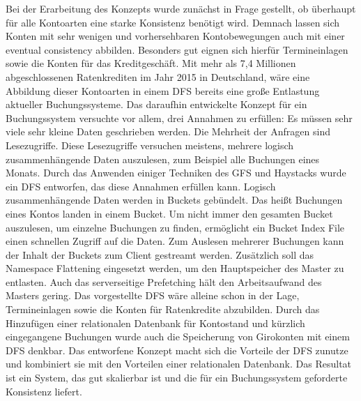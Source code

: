 \documentclass[12pt,oneside,a4paper,parskip]{scrbook}
\begin{document}
Bei der Erarbeitung des Konzepts wurde zunächst in Frage gestellt, ob überhaupt für alle Kontoarten eine starke Konsistenz benötigt wird. Demnach lassen sich Konten mit sehr wenigen und vorhersehbaren Kontobewegungen auch mit einer eventual consistency abbilden. Besonders gut eignen sich hierfür Termineinlagen sowie die Konten für das Kreditgeschäft. Mit mehr als 7,4 Millionen abgeschlossenen Ratenkrediten im Jahr 2015 in Deutschland, wäre eine Abbildung dieser Kontoarten in einem DFS bereits eine große Entlastung aktueller Buchungssysteme. Das daraufhin entwickelte Konzept für ein Buchungssystem versuchte vor allem, drei Annahmen zu erfüllen: Es müssen sehr viele sehr kleine Daten geschrieben werden. Die Mehrheit der Anfragen sind Lesezugriffe. Diese Lesezugriffe versuchen meistens, mehrere logisch zusammenhängende Daten auszulesen, zum Beispiel alle Buchungen eines Monats. Durch das Anwenden einiger Techniken des GFS und Haystacks wurde ein DFS entworfen, das diese Annahmen erfüllen kann. Logisch zusammenhängende Daten werden in Buckets gebündelt. Das heißt Buchungen eines Kontos landen in einem Bucket. Um nicht immer den gesamten Bucket auszulesen, um einzelne Buchungen zu finden, ermöglicht ein Bucket Index File einen schnellen Zugriff auf die Daten. Zum Auslesen mehrerer Buchungen kann der Inhalt der Buckets zum Client gestreamt werden. Zusätzlich soll das Namespace Flattening eingesetzt werden, um den Hauptspeicher des Master zu entlasten. Auch das serverseitige Prefetching hält den Arbeitsaufwand des Masters gering. Das vorgestellte DFS wäre alleine schon in der Lage, Termineinlagen sowie die Konten für Ratenkredite abzubilden. Durch das Hinzufügen einer relationalen Datenbank für Kontostand und kürzlich eingegangene Buchungen wurde auch die Speicherung von Girokonten mit einem DFS denkbar. Das entworfene Konzept macht sich die Vorteile der DFS zunutze und kombiniert sie mit den Vorteilen einer relationalen Datenbank. Das Resultat ist ein System, das gut skalierbar ist und die für ein Buchungssystem geforderte Konsistenz liefert.
\end{document}
